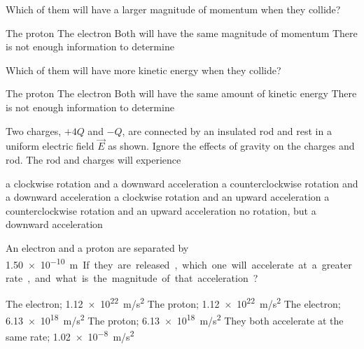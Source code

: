 \documentclass{../../../oss-apphys-exam}
\begin{document}
\begin{questions}
  \question Which of them will have a larger magnitude of momentum when they
  collide?
  \label{pair1}
  \begin{choices}
    \choice The proton
    \choice The electron
    \choice Both will have the same magnitude of momentum
    \choice There is not enough information to determine
  \end{choices}

  \question Which of them will have more kinetic energy when they collide?
  \label{pair2}
  \begin{choices}
    \choice The proton
    \choice The electron
    \choice Both will have the same amount of kinetic energy
    \choice There is not enough information to determine
  \end{choices}
    
  \question Two charges, $+4Q$ and $-Q$, are connected by an insulated rod and
  rest in a uniform electric field $\vec E$ as shown. Ignore the effects of
  gravity on the charges and rod. The rod and charges will experience
  \begin{choices}
    \choice a clockwise rotation and a downward acceleration
    \choice a counterclockwise rotation and a downward acceleration
    \choice a clockwise rotation and an upward acceleration
    \choice a counterclockwise rotation and an upward acceleration
    \choice no rotation, but a downward acceleration
  \end{choices}
  
  \question An electron and a proton are separated by \SI{1.50e-10}\metre. If
  they are released, which one will accelerate at a greater rate, and what is
  the magnitude of that acceleration?
  \begin{choices}
    \choice The electron; \SI{1.12e22}{m/s^2}
    \choice The proton; \SI{1.12e22}{m/s^2}
    \choice The electron; \SI{6.13e18}{m/s^2}
    \choice The proton; \SI{6.13e18}{m/s^2}
    \choice They both accelerate at the same rate; \SI{1.02e-8}{m/s^2}
  \end{choices}
    

\end{questions}
\end{document}
